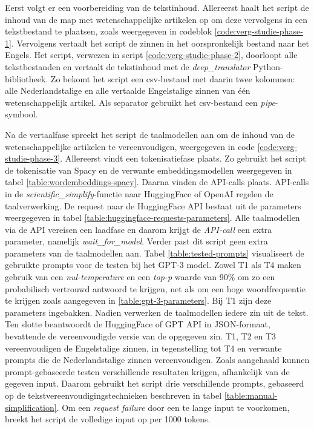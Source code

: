\medspace

Eerst volgt er een voorbereiding van de tekstinhoud. Allereerst haalt het script de inhoud van de map met wetenschappelijke artikelen op om deze vervolgens in een tekstbestand te plaatsen, zoals weergegeven in codeblok \ref{code:verg-studie-phase-1}. Vervolgens vertaalt het script de zinnen in het oorspronkelijk bestand naar het Engels. Het script, verwezen in script \ref{code:verg-studie-phase-2}, doorloopt alle tekstbestanden en vertaalt de tekstinhoud met de \textit{deep\_translator} Python-bibliotheek. Zo bekomt het script een csv-bestand met daarin twee kolommen: alle Nederlandstalige en alle vertaalde Engelstalige zinnen van één wetenschappelijk artikel. Als separator gebruikt het csv-bestand een \textit{pipe}-symbool.

\medspace

Na de vertaalfase spreekt het script de taalmodellen aan om de inhoud van de wetenschappelijke artikelen te vereenvoudigen, weergegeven in code \ref{code:verg-studie-phase-3}. Allereerst vindt een tokenisatiefase plaats. Zo gebruikt het script de tokenisatie van Spacy en de verwante embeddingsmodellen weergegeven in tabel \ref{table:wordembeddings-spacy}. Daarna vinden de API-calls plaats. API-calls in de \textit{scientific\_simplify}-functie naar HuggingFace of OpenAI regelen de taalverwerking. De request naar de HuggingFace API bestaat uit de parameters weergegeven in tabel \ref{table:huggingface-requests-parameters}. Alle taalmodellen via de API vereisen een laadfase en daarom krijgt de \textit{API-call} een extra parameter, namelijk \textit{wait\_for\_model}. Verder past dit script geen extra parameters van de taalmodellen aan. Tabel \ref{table:tested-prompts} visualiseert de gebruikte prompts voor de testen bij het GPT-3 model. Zowel T1 als T4 maken gebruik van een \textit{nul-temperature} en een \textit{top-p} waarde van 90\% om zo een probabilisch vertrouwd antwoord te krijgen, net als om een hoge woordfrequentie te krijgen zoals aangegeven in \ref{table:gpt-3-parameters}. Bij T1 zijn deze parameters ingebakken. Nadien verwerken de taalmodellen iedere zin uit de tekst. Ten slotte beantwoordt de HuggingFace of GPT API in JSON-formaat, bevattende de vereenvoudigde versie van de opgegeven zin. T1, T2 en T3 vereenvoudigen de Engelstalige zinnen, in tegenstelling tot T4 en verwante prompts die de Nederlandstalige zinnen vereenvoudigen. Zoals aangehaald kunnen prompt-gebaseerde testen verschillende resultaten krijgen, afhankelijk van de gegeven input. Daarom gebruikt het script drie verschillende prompts, gebaseerd op de tekstvereenvoudigingstechnieken beschreven in tabel \ref{table:manual-simplification}. Om een \textit{request failure} door een te lange input te voorkomen, breekt het script de volledige input op per 1000 tokens.



